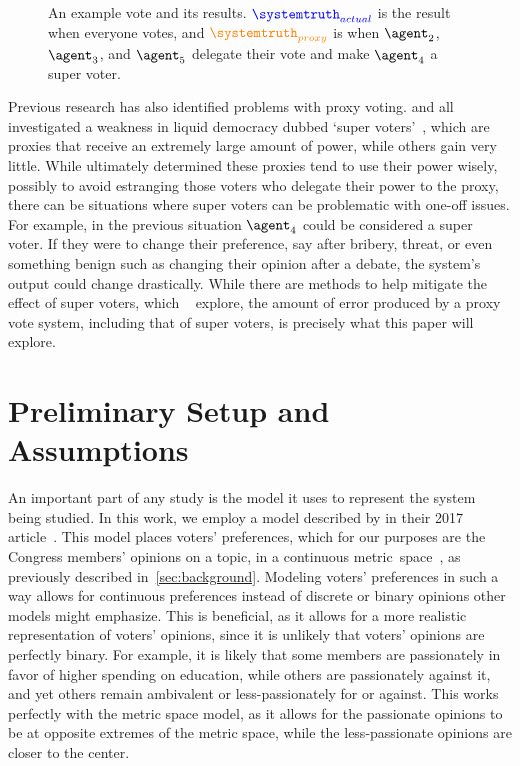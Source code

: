 \begin{figure}[htbp]
    \centering
    
    \caption{
        An example vote and its results.
        $\textcolor{blue}{\systemtruth_{actual}}$ is the result when everyone votes,
        and $\textcolor{orange}{\systemtruth_{proxy}}$ is when $\agent_2$, $\agent_3$,
        and $\agent_5$ delegate their vote and make $\agent_4$ a super voter.
    }
    \label{fig:voting-example}
\end{figure}

Previous research has also identified problems with proxy voting.
 and  all investigated a weakness in liquid democracy dubbed
`super voters'~\cite{Kling2015,Golz2021}, which are proxies that receive an extremely
large amount of power, while others gain very little.
While  ultimately determined these proxies tend to use their power
wisely, possibly to avoid estranging those voters who delegate their power to the
proxy, there can be situations where super voters can be problematic with one-off
issues.
For example, in the previous situation $\agent_4$ could be considered a super voter.
If they were to change their preference, say after bribery, threat, or even
something benign such as changing their opinion after a debate, the system's output
could change drastically.
While there are methods to help mitigate the effect of super voters, which
~\cite{Golz2021} explore, the amount of error produced by a proxy vote
system, including that of super voters, is precisely what this paper will explore.


\section{Preliminary Setup and Assumptions}\label{sec:setup-and-assumptions}
An important part of any study is the model it uses to represent the system being
studied.
In this work, we employ a model described by  in their 2017
article~\cite{Cohensius2017}.
This model places voters' preferences, which for our purposes are the Congress
members' opinions on a topic, in a continuous metric~space~\systemspace, as 
previously described in~\autoref{sec:background}.
Modeling voters' preferences in such a way allows for continuous preferences instead of
discrete or binary opinions other models might emphasize.
This is beneficial, as it allows for a more realistic representation of voters'
opinions, since it is unlikely that voters' opinions are perfectly binary.
For example, it is likely that some members are passionately in favor of higher
spending on education, while others are passionately against it, and yet others
remain ambivalent or less-passionately for or against.
This works perfectly with the metric space model, as it allows for the passionate
opinions to be at opposite extremes of the metric space, while the less-passionate
opinions are closer to the center.

